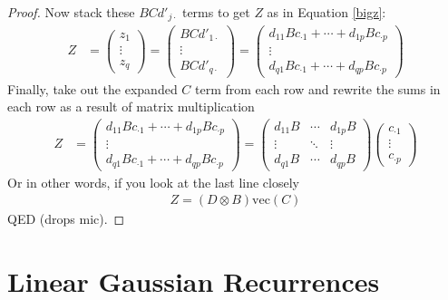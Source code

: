 \documentclass[12pt]{article}
\theoremstyle{plain}
\theoremstyle{definition}
\theoremstyle{remark}
\begin{document}
\begin{proof}
\newpage
Now stack these $BCd'_{j\cdot}$ terms
to get $Z$ as in Equation \ref{bigz}:
\begin{align}
    Z &= \begin{pmatrix} z_1 \\ \vdots \\ z_q
	\end{pmatrix} =
	\begin{pmatrix} BCd'_{1\cdot} \\ \vdots \\ BCd'_{q\cdot}
	\end{pmatrix}
    = \begin{pmatrix}
	    d_{1 1} Bc_{\cdot 1} + \cdots
	    +  d_{1 p}Bc_{\cdot p} \\
	    \vdots \\
	    d_{q 1} Bc_{\cdot 1} + \cdots
	    +  d_{q p}Bc_{\cdot p}
	\end{pmatrix}
\end{align}
Finally, take out the expanded $C$ term from
each row and rewrite the sums in each row
as a result of matrix multiplication
\begin{align}
    Z &=\begin{pmatrix}
	    d_{1 1} Bc_{\cdot 1} + \cdots
	    +  d_{1 p}Bc_{\cdot p} \\
	    \vdots \\
	    d_{q 1} Bc_{\cdot 1} + \cdots
	    +  d_{q p}Bc_{\cdot p}
	\end{pmatrix}
    = \begin{pmatrix}
	    d_{1 1} B & \cdots
	    &  d_{1 p}B \\
	    \vdots & \ddots & \vdots \\
	    d_{q 1} B & \cdots
	    &  d_{q p}B
	\end{pmatrix}
    \begin{pmatrix}
	c_{\cdot 1} \\ \vdots \\ c_{\cdot p}
    \end{pmatrix}
\end{align}
Or in other words, if you look at the
last line closely
\begin{align*}
    Z = (D\otimes B) \text{vec}(C)
\end{align*}
QED (drops mic).
\end{proof}


\section{Linear Gaussian Recurrences}
\end{document}
